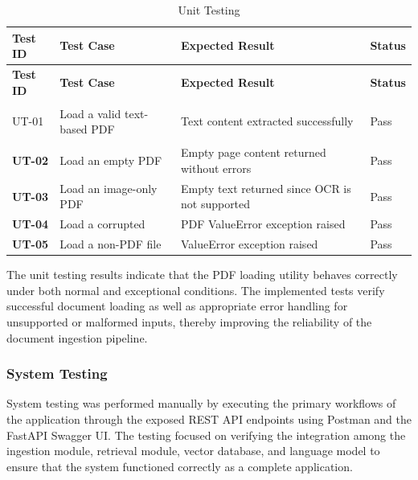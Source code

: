 \begin{xltabular}{\textwidth}{|>{\bfseries}p{3.5cm}|X|X|X|}
    \caption{Unit Testing} \\
    
    \hline
        \textbf{Test ID} & \textbf{Test Case} & \textbf{Expected Result} & \textbf{Status} \\
    \hline
    \endfirsthead

    \hline
        \textbf{Test ID} & \textbf{Test Case} & \textbf{Expected Result} & \textbf{Status} \\
    \hline
    \endhead

        UT-01 & Load a valid text-based PDF & Text content extracted successfully & Pass \\
        \hline
        UT-02 & Load an empty PDF & Empty page content returned without errors & Pass \\
        \hline
        UT-03 & Load an image-only PDF & Empty text returned since OCR is not supported & Pass \\
        \hline
        UT-04 & Load a corrupted & PDF ValueError exception raised & Pass \\
        \hline
        UT-05 & Load a non-PDF file & ValueError exception raised & Pass \\
        \hline
\end{xltabular}

The unit testing results indicate that the PDF loading utility behaves correctly under both normal and exceptional conditions. The implemented tests verify successful document loading as well as appropriate error handling for unsupported or malformed inputs, thereby improving the reliability of the document ingestion pipeline. \par

\subsubsection{System Testing}
System testing was performed manually by executing the primary workflows of the application through the exposed REST API endpoints using Postman and the FastAPI Swagger UI. The testing focused on verifying the integration among the ingestion module, retrieval module, vector database, and language model to ensure that the system functioned correctly as a complete application. \par

